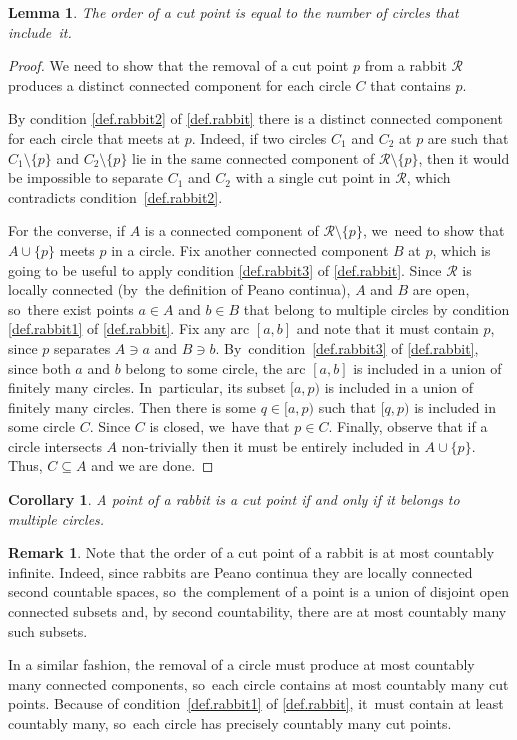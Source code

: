 \documentclass[10pt,a4paper]{amsart}
\newtheorem{lemma}[lemma]{Lemma}
\newtheorem{corollary}[corollary]{Corollary}
\theoremstyle{definition}
\newtheorem{remark}[remark]{Remark}
\newcommand{\R}{\mathcal{R}}
\begin{document}
\begin{lemma}
\label{lem.cut.points.order}
The order of a cut point is equal to the number of circles that include~it.
\end{lemma}

\begin{proof}
We need to show that the removal of a cut point $p$ from a rabbit $\R$ produces a distinct connected component for each circle $C$ that contains $p$.

By condition \cref{def.rabbit2} of \cref{def.rabbit} there is a distinct connected component for each circle that meets at $p$.
Indeed, if two circles $C_1$ and $C_2$ at $p$ are such that $C_1 \setminus \{p\}$ and $C_2 \setminus \{p\}$ lie in the same connected component of $\R \setminus \{p\}$, then it would be impossible to separate $C_1$ and $C_2$ with a single cut point in $\R$, which contradicts condition~\cref{def.rabbit2}.

For the converse, if $A$ is a connected component of $\R \setminus \{p\}$, we~need to show that $A \cup \{p\}$ meets $p$ in a circle.
Fix another connected component $B$ at $p$, which is going to be useful to apply condition \cref{def.rabbit3} of \cref{def.rabbit}.
Since $\R$ is locally connected (by~the definition of Peano continua), $A$ and $B$ are open, so~there exist points $a \in A$ and $b \in B$ that belong to multiple circles by condition \cref{def.rabbit1} of \cref{def.rabbit}.
Fix any arc $[a,b]$ and note that it must contain $p$, since $p$ separates $A \ni a$ and $B \ni b$. By~condition~\cref{def.rabbit3} of \cref{def.rabbit}, since both $a$ and $b$ belong to some circle, the arc $[a,b]$ is included in a union of finitely many circles. In~particular, its subset $[a,p)$ is included in a union of finitely many circles.
Then there is some $q \in [a,p)$ such that $[q,p)$ is included in some circle $C$.
Since $C$ is closed, we~have that $p \in C$.
Finally, observe that if a circle intersects $A$ non-trivially then it must be entirely included in $A \cup \{p\}$.
Thus, $C \subseteq A$ and we are done.
\end{proof}

\begin{corollary}
\label{cor.rabbit.cut.points}
A point of a rabbit is a cut point if and only if it belongs to multiple circles.
\end{corollary}

\begin{remark}
\label{rmk.rabbit.countable}
Note that the order of a cut point of a rabbit is at most countably infinite.
Indeed, since rabbits are Peano continua they are locally connected second countable spaces, so~the complement of a point is a union of disjoint open connected subsets and, by second countability, there are at most countably many such subsets.

In a similar fashion, the removal of a circle must produce at most countably many connected components, so~each circle contains at most countably many cut points.
Because of condition~\cref{def.rabbit1} of \cref{def.rabbit}, it~must contain at least countably many, so~each circle has precisely countably many cut points.
\end{remark}
\end{document}
